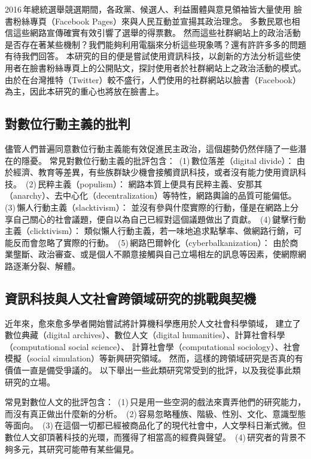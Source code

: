 \documentclass[letterpaper, 10pt, conference]{ieeeconf}   %
\begin{document}
\begin{CJK}{UTF8}{bsmi}
2016\,年總統選舉競選期間，各政黨、候選人、利益團體與意見領袖皆大量使用
臉書粉絲專頁（Facebook Pages）來與人民互動並宣揚其政治理念。
多數民眾也相信這些網路宣傳確實有效引響了選舉的得票數。
然而這些社群網站上的政治活動是否存在著某些機制？我們能夠利用電腦來分析這些現象嗎？還有許許多多的問題有待我們回答。
本研究的目的便是嘗試使用資訊科技，以創新的方法分析這些使用者在臉書粉絲專頁上的公開貼文，探討使用者於社群網站上之政治活動的模式。
由於在台灣推特（Twitter）較不盛行，人們使用的社群網站以臉書（Facebook）為主，因此本研究的重心也將放在臉書上。

\subsection*{對數位行動主義的批判}

儘管人們普遍同意數位行動主義能有效促進民主政治，這個趨勢仍然伴隨了一些潛在的隱憂。
常見對數位行動主義的批評包含：
\,(1)\,數位落差（digital divide）：
由於經濟、教育等差異，有些族群缺少機會接觸資訊科技，或者沒有能力使用資訊科技。
\,(2)\,民粹主義（populism）：
網路本質上便具有民粹主義、安那其（anarchy）、去中心化（decentralization）等特性，網路輿論的品質可能偏低。
\,(3)\,懶人行動主義（slacktivism）：
並沒有參與什麼實際的行動，僅是在網路上分享自己關心的社會議題，便自以為自己已經對這個議題做出了貢獻。
\,(4)\,鍵擊行動主義（clicktivism）：
類似懶人行動主義，若一味地追求點擊率、做網路行銷，可能反而會忽略了實際的行動。
\,(5)\,網路巴爾幹化（cyberbalkanization）：
由於商業壟斷、政治審查、或是個人不願意接觸與自己立場相左的訊息等因素，使網際網路逐漸分裂、解體。

\subsection*{資訊科技與人文社會跨領域研究的挑戰與契機}

近年來，愈來愈多學者開始嘗試將計算機科學應用於人文社會科學領域，
建立了數位典藏（digital archives）、數位人文（digital humanities）、計算社會科學（computational social science）、
計算社會學（computational sociology）、社會模擬（social simulation）等新興研究領域。
然而，這樣的跨領域研究是否真的有價值一直是備受爭議的。
以下舉出一些此類研究常受到的批評，以及我從事此類研究的立場。

常見對數位人文的批評包含：
\,(1)\,只是用一些空洞的戲法來賣弄他們的研究能力，而沒有真正做出什麼新的分析。
\,(2)\,容易忽略種族、階級、性別、文化、意識型態等面向。
\,(3)\,在這個一切都已經被商品化了的現代社會中，人文學科日漸式微。但數位人文卻頂著科技的光環，而獲得了相當高的經費與聲望。
\,(4)\,研究者的背景不夠多元，其研究可能帶有某些偏見。


\end{CJK}
\end{document}
